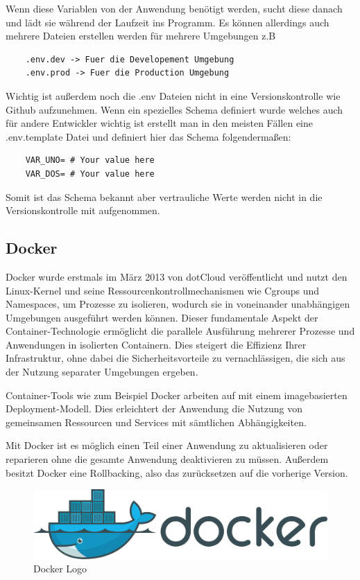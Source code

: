 Wenn diese Variablen von der Anwendung benötigt werden, sucht diese danach und lädt sie während der Laufzeit ins Programm. 
Es können allerdings auch mehrere Dateien erstellen werden für mehrere Umgebungen z.B
\begin{verbatim}
    .env.dev -> Fuer die Developement Umgebung
    .env.prod -> Fuer die Production Umgebung
\end{verbatim}

Wichtig ist außerdem noch die .env Dateien nicht in eine Versionskontrolle wie Github aufzunehmen. Wenn ein spezielles Schema definiert wurde welches auch für andere Entwickler wichtig ist erstellt man in den meisten Fällen eine .env.template Datei und definiert hier das Schema folgendermaßen:

\begin{verbatim}
    VAR_UNO= # Your value here
    VAR_DOS= # Your value here
\end{verbatim}

Somit ist das Schema bekannt aber vertrauliche Werte werden nicht in die Versionskontrolle mit aufgenommen.


\cite{Umgebungsvariablen}




\subsection{Docker}

Docker wurde erstmals im März 2013 von dotCloud veröffentlicht und nutzt den Linux-Kernel und seine Ressourcenkontrollmechanismen wie Cgroups und Namespaces, um Prozesse zu isolieren, wodurch sie in voneinander unabhängigen Umgebungen ausgeführt werden können. Dieser fundamentale Aspekt der Container-Technologie ermöglicht die parallele Ausführung mehrerer Prozesse und Anwendungen in isolierten Containern. Dies steigert die Effizienz Ihrer Infrastruktur, ohne dabei die Sicherheitsvorteile zu vernachlässigen, die sich aus der Nutzung separater Umgebungen ergeben.

Container-Tools wie zum Beispiel Docker arbeiten auf mit einem imagebasierten Deployment-Modell. Dies erleichtert der Anwendung die Nutzung von gemeinsamen Ressourcen und Services mit sämtlichen Abhängigkeiten.

Mit Docker ist es möglich einen Teil einer Anwendung zu aktualisieren oder reparieren ohne die gesamte Anwendung deaktivieren zu müssen. Außerdem besitzt Docker eine Rollbacking, also das zurücksetzen auf die vorherige Version.

\begin{figure}[h!]
    \centering
    \includegraphics[width=0.7\linewidth]{pics/docker-logo.png}
    \caption{Docker Logo}
    \label{fig:enter-label}
\end{figure}

\cite{Vorteile_Nachteile_Docker}
\cite{Was_ist_Docker}




